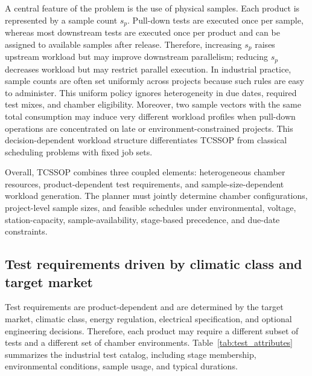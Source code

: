 \documentclass[11pt]{article}
\begin{document}
A central feature of the problem is the use of physical samples. Each product is represented by a sample count \(s_p\). Pull-down tests are executed once per sample, whereas most downstream tests are executed once per product and can be assigned to available samples after release. Therefore, increasing \(s_p\) raises upstream workload but may improve downstream parallelism; reducing \(s_p\) decreases workload but may restrict parallel execution. In industrial practice, sample counts are often set uniformly across projects because such rules are easy to administer. This uniform policy ignores heterogeneity in due dates, required test mixes, and chamber eligibility. Moreover, two sample vectors with the same total consumption may induce very different workload profiles when pull-down operations are concentrated on late or environment-constrained projects. This decision-dependent workload structure differentiates TCSSOP from classical scheduling problems with fixed job sets.

Overall, TCSSOP combines three coupled elements: heterogeneous chamber resources, product-dependent test requirements, and sample-size-dependent workload generation. The planner must jointly determine chamber configurations, project-level sample sizes, and feasible schedules under environmental, voltage, station-capacity, sample-availability, stage-based precedence, and due-date constraints.

\subsection{Test requirements driven by climatic class and target market}
\label{subsec:test_requirements}

Test requirements are product-dependent and are determined by the target market, climatic class, energy regulation, electrical specification, and optional engineering decisions. Therefore, each product may require a different subset of tests and a different set of chamber environments. Table~\ref{tab:test_attributes} summarizes the industrial test catalog, including stage membership, environmental conditions, sample usage, and typical durations.
\end{document}
